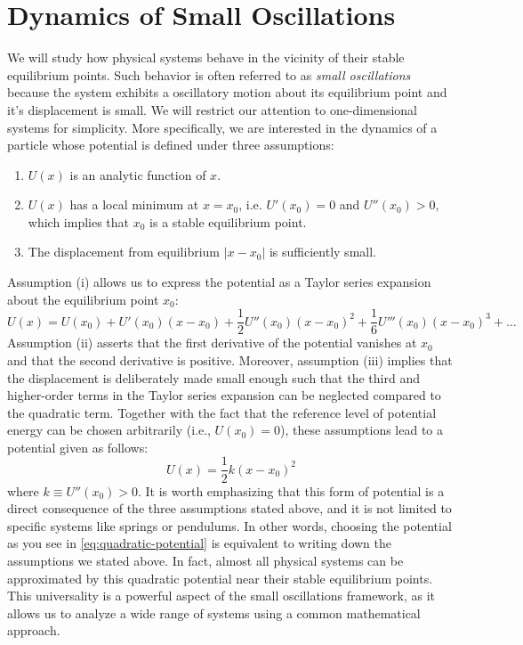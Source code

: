 \documentclass[12pt,oneside]{book}
\numberwithin{equation}{chapter}
\begin{document}
\section{Dynamics of Small Oscillations}
We will study how physical systems behave in the vicinity of their stable equilibrium points. Such behavior is often referred to as \textit{small oscillations} because the system exhibits a oscillatory motion about its equilibrium point and it's displacement is small. We will restrict our attention to one-dimensional systems for simplicity. More specifically, we are interested in the dynamics of a particle whose potential is defined under three assumptions:
\begin{enumerate}
    \item[(i)] $U(x)$ is an analytic function of $x$.
    \item[(ii)] $U(x)$ has a local minimum at $x = x_0$, i.e. $U'(x_0) = 0$ and $U''(x_0) > 0$, which implies that $x_0$ is a stable equilibrium point.
    \item[(iii)] The displacement from equilibrium $|x - x_0|$ is sufficiently small.
\end{enumerate}
Assumption (i) allows us to express the potential as a Taylor series expansion about the equilibrium point $x_0$:
\begin{equation}
    U(x) = U(x_0) + U'(x_0) (x - x_0) + \frac{1}{2} U''(x_0) (x - x_0)^2 + \frac{1}{6} U'''(x_0) (x - x_0)^3 + \ldots 
\end{equation}
Assumption (ii) asserts that the first derivative of the potential vanishes at $x_0$ and that the second derivative is positive. Moreover, assumption (iii) implies that the displacement is deliberately made small enough such that the third and higher-order terms in the Taylor series expansion can be neglected compared to the quadratic term. Together with the fact that the reference level of potential energy can be chosen arbitrarily (i.e., $U(x_0) = 0$), these assumptions lead to a potential given as follows:
\begin{equation}
    U(x) = \frac{1}{2} k (x - x_0)^2
    \label{eq:quadratic-potential}
\end{equation}
where $k \equiv U''(x_0) > 0$. It is worth emphasizing that this form of potential is a direct consequence of the three assumptions stated above, and it is not limited to specific systems like springs or pendulums. In other words, choosing the potential as you see in \eqref{eq:quadratic-potential} is equivalent to writing down the assumptions we stated above. In fact, almost all physical systems can be approximated by this quadratic potential near their stable equilibrium points. This universality is a powerful aspect of the small oscillations framework, as it allows us to analyze a wide range of systems using a common mathematical approach.
\end{document}
